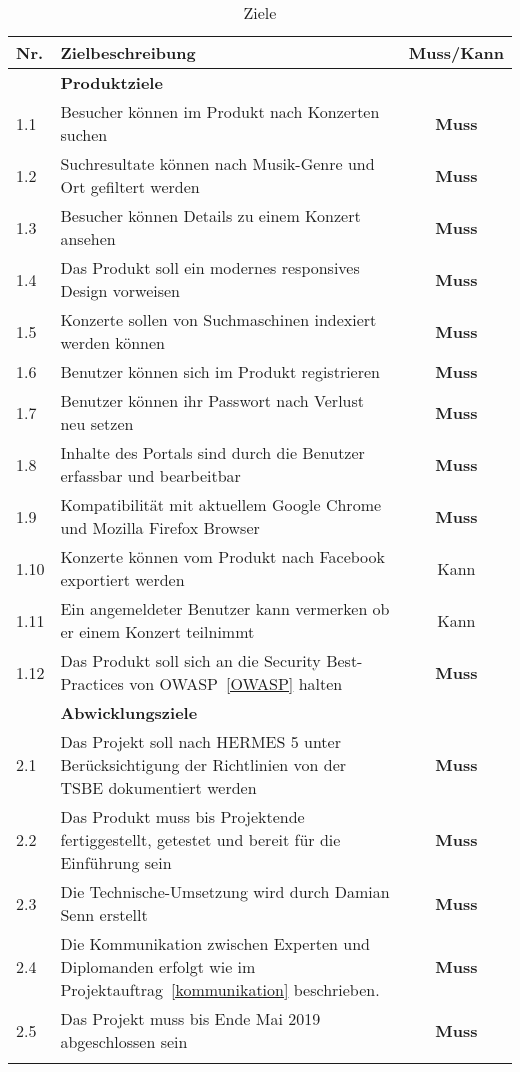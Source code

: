\begin{longtable}[]{@{}lp{10.5cm}c@{}}
  \toprule
  Nr.  & Zielbeschreibung                                                                                                   & Muss/Kann\tabularnewline
  \toprule
       & \textbf{Produktziele}\tabularnewline
  \midrule
  1.1  & Besucher können im Produkt nach Konzerten suchen                                                                   & \textbf{Muss}\tabularnewline
  1.2  & Suchresultate können nach Musik-Genre und Ort gefiltert werden                                                     & \textbf{Muss}\tabularnewline
  1.3  & Besucher können Details zu einem Konzert ansehen                                                                   & \textbf{Muss}\tabularnewline
  1.4  & Das Produkt soll ein modernes responsives Design vorweisen                                                         & \textbf{Muss}\tabularnewline
  1.5  & Konzerte sollen von Suchmaschinen indexiert werden können                                                          & \textbf{Muss}\tabularnewline
  1.6  & Benutzer können sich im Produkt registrieren                                                                       & \textbf{Muss}\tabularnewline
  1.7  & Benutzer können ihr Passwort nach Verlust neu setzen                                                               & \textbf{Muss}\tabularnewline
  1.8  & Inhalte des Portals sind durch die Benutzer erfassbar und bearbeitbar                                              & \textbf{Muss}\tabularnewline
  1.9  & Kompatibilität mit aktuellem Google Chrome und Mozilla Firefox Browser                                             & \textbf{Muss}\tabularnewline
  1.10 & Konzerte können vom Produkt nach Facebook exportiert werden                                                        & Kann\tabularnewline
  1.11 & Ein angemeldeter Benutzer kann vermerken ob er einem Konzert teilnimmt                                             & Kann\tabularnewline
  1.12 & Das Produkt soll sich an die Security Best-Practices von OWASP~\ref{OWASP} halten                                  & \textbf{Muss}\tabularnewline
  \toprule
       & \textbf{Abwicklungsziele}\tabularnewline
  \midrule
  2.1  & Das Projekt soll nach HERMES 5 unter Berücksichtigung der Richtlinien von der TSBE dokumentiert werden             & \textbf{Muss}\tabularnewline
  2.2  & Das Produkt muss bis Projektende fertiggestellt, getestet und bereit für die Einführung sein                       & \textbf{Muss}\tabularnewline
  2.3  & Die Technische-Umsetzung wird durch Damian Senn erstellt                                                           & \textbf{Muss}\tabularnewline
  2.4  & Die Kommunikation zwischen Experten und Diplomanden erfolgt wie im Projektauftrag~\ref{kommunikation} beschrieben. & \textbf{Muss}\tabularnewline
  2.5  & Das Projekt muss bis Ende Mai 2019 abgeschlossen sein                                                              & \textbf{Muss}\tabularnewline
  \bottomrule
  \caption{Ziele}
\end{longtable}
